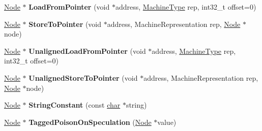 \begin{DoxyCompactItemize}
\mbox{\hyperlink{classv8_1_1internal_1_1compiler_1_1Node}{Node}} $\ast$ {\bfseries Load\+From\+Pointer} (void $\ast$address, \mbox{\hyperlink{classv8_1_1internal_1_1MachineType}{Machine\+Type}} rep, int32\+\_\+t offset=0)
\item 
\mbox{\label{classv8_1_1internal_1_1compiler_1_1RawMachineAssembler_aef09077687542be6b4bd7003b3970fba}} 
\mbox{\hyperlink{classv8_1_1internal_1_1compiler_1_1Node}{Node}} $\ast$ {\bfseries Store\+To\+Pointer} (void $\ast$address, Machine\+Representation rep, \mbox{\hyperlink{classv8_1_1internal_1_1compiler_1_1Node}{Node}} $\ast$node)
\item 
\mbox{\label{classv8_1_1internal_1_1compiler_1_1RawMachineAssembler_a24739f9e3a4080cc14911e32a597bf35}} 
\mbox{\hyperlink{classv8_1_1internal_1_1compiler_1_1Node}{Node}} $\ast$ {\bfseries Unaligned\+Load\+From\+Pointer} (void $\ast$address, \mbox{\hyperlink{classv8_1_1internal_1_1MachineType}{Machine\+Type}} rep, int32\+\_\+t offset=0)
\item 
\mbox{\label{classv8_1_1internal_1_1compiler_1_1RawMachineAssembler_a1bca94c8c3534269b156cead456917ce}} 
\mbox{\hyperlink{classv8_1_1internal_1_1compiler_1_1Node}{Node}} $\ast$ {\bfseries Unaligned\+Store\+To\+Pointer} (void $\ast$address, Machine\+Representation rep, \mbox{\hyperlink{classv8_1_1internal_1_1compiler_1_1Node}{Node}} $\ast$node)
\item 
\mbox{\label{classv8_1_1internal_1_1compiler_1_1RawMachineAssembler_abb8e262a53d994fc5fbfa1279445c664}} 
\mbox{\hyperlink{classv8_1_1internal_1_1compiler_1_1Node}{Node}} $\ast$ {\bfseries String\+Constant} (const \mbox{\hyperlink{classchar}{char}} $\ast$string)
\item 
\mbox{\label{classv8_1_1internal_1_1compiler_1_1RawMachineAssembler_a5aa3698628e5be9e698494c800c1f6b4}} 
\mbox{\hyperlink{classv8_1_1internal_1_1compiler_1_1Node}{Node}} $\ast$ {\bfseries Tagged\+Poison\+On\+Speculation} (\mbox{\hyperlink{classv8_1_1internal_1_1compiler_1_1Node}{Node}} $\ast$value)
\item 
\mbox{\label{classv8_1_1internal_1_1compiler_1_1RawMachineAssembler_a4275b7b000113144b3ac4ea05f2ed9bd}} 

\end{DoxyCompactItemize}
